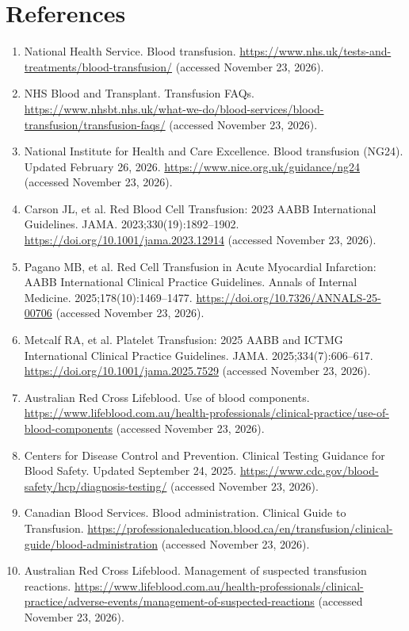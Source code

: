 \section*{References}
\begin{enumerate}
  \item National Health Service. Blood transfusion. \url{https://www.nhs.uk/tests-and-treatments/blood-transfusion/} (accessed November 23, 2026).
  \item NHS Blood and Transplant. Transfusion FAQs. \url{https://www.nhsbt.nhs.uk/what-we-do/blood-services/blood-transfusion/transfusion-faqs/} (accessed November 23, 2026).
  \item National Institute for Health and Care Excellence. Blood transfusion (NG24). Updated February 26, 2026. \url{https://www.nice.org.uk/guidance/ng24} (accessed November 23, 2026).
  \item Carson JL, et al. Red Blood Cell Transfusion: 2023 AABB International Guidelines. JAMA. 2023;330(19):1892--1902. \url{https://doi.org/10.1001/jama.2023.12914} (accessed November 23, 2026).
  \item Pagano MB, et al. Red Cell Transfusion in Acute Myocardial Infarction: AABB International Clinical Practice Guidelines. Annals of Internal Medicine. 2025;178(10):1469--1477. \url{https://doi.org/10.7326/ANNALS-25-00706} (accessed November 23, 2026).
  \item Metcalf RA, et al. Platelet Transfusion: 2025 AABB and ICTMG International Clinical Practice Guidelines. JAMA. 2025;334(7):606--617. \url{https://doi.org/10.1001/jama.2025.7529} (accessed November 23, 2026).
  \item Australian Red Cross Lifeblood. Use of blood components. \url{https://www.lifeblood.com.au/health-professionals/clinical-practice/use-of-blood-components} (accessed November 23, 2026).
  \item Centers for Disease Control and Prevention. Clinical Testing Guidance for Blood Safety. Updated September 24, 2025. \url{https://www.cdc.gov/blood-safety/hcp/diagnosis-testing/} (accessed November 23, 2026).
  \item Canadian Blood Services. Blood administration. Clinical Guide to Transfusion. \url{https://professionaleducation.blood.ca/en/transfusion/clinical-guide/blood-administration} (accessed November 23, 2026).
  \item Australian Red Cross Lifeblood. Management of suspected transfusion reactions. \url{https://www.lifeblood.com.au/health-professionals/clinical-practice/adverse-events/management-of-suspected-reactions} (accessed November 23, 2026).
\end{enumerate}

\clearpage
